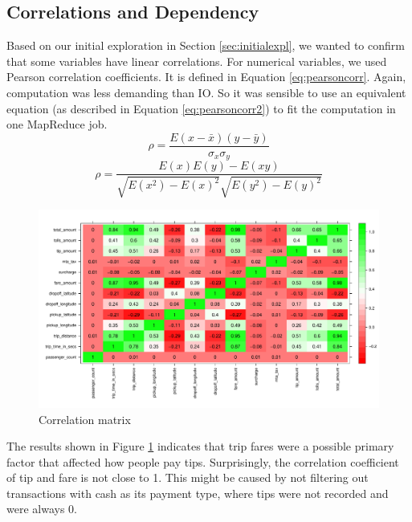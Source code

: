 \documentclass[12pt,a4paper]{article}
\begin{document}
  \subsection{Correlations and Dependency}
  Based on our initial exploration in Section \ref{sec:initialexpl}, we wanted to confirm that some variables have linear correlations. For numerical variables, we used Pearson correlation coefficients. It is defined in Equation \ref{eq:pearsoncorr}. Again, computation was less demanding than IO. So it was sensible to use an equivalent equation (as described in Equation \ref{eq:pearsoncorr2}) to fit the computation in one MapReduce job. 
  \begin{equation}
    \label{eq:pearsoncorr}
    \rho =\frac{E(x-\bar{x})(y-\bar{y})}{\sigma_x\sigma_y}
  \end{equation}
  \begin{equation}
    \label{eq:pearsoncorr2}
    \rho =\frac{E(x)E(y)-E(xy)}{\sqrt{E(x^2)-E(x)^2}\sqrt{E(y^2)-E(y)^2}}
  \end{equation}
  \begin{figure}[h]
    \centering
    \caption{Correlation matrix}
    \label{fig:corrmatrix}
    \includegraphics[scale=0.4]{plot/corrmatrix}
  \end{figure}
  The results shown in Figure \ref{fig:corrmatrix} indicates that trip fares were a possible primary factor that affected how people pay tips. Surprisingly, the correlation coefficient of tip and fare is not close to 1. This might be caused by not filtering out transactions with cash as its payment type, where tips were not recorded and were always 0.
\end{document}
